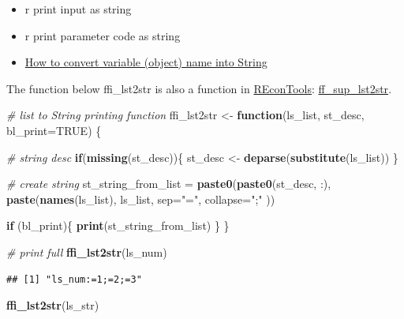 \documentclass[
]{book}
\newenvironment{Shaded}{\begin{snugshade}}{\end{snugshade}}
\newcommand{\CommentTok}[1]{\textcolor[rgb]{0.56,0.35,0.01}{\textit{#1}}}
\newcommand{\ControlFlowTok}[1]{\textcolor[rgb]{0.13,0.29,0.53}{\textbf{#1}}}
\newcommand{\DataTypeTok}[1]{\textcolor[rgb]{0.13,0.29,0.53}{#1}}
\newcommand{\KeywordTok}[1]{\textcolor[rgb]{0.13,0.29,0.53}{\textbf{#1}}}
\newcommand{\NormalTok}[1]{#1}
\newcommand{\OtherTok}[1]{\textcolor[rgb]{0.56,0.35,0.01}{#1}}
\newcommand{\StringTok}[1]{\textcolor[rgb]{0.31,0.60,0.02}{#1}}
\providecommand{\tightlist}{%
  \setlength{\itemsep}{0pt}\setlength{\parskip}{0pt}}
\begin{document}
\begin{itemize}
\tightlist
\item
  r print input as string
\item
  r print parameter code as string
\item
  \href{https://stackoverflow.com/a/14577878/8280804}{How to convert variable (object) name into String}
\end{itemize}

The function below ffi\_lst2str is also a function in \href{https://fanwangecon.github.io/REconTools/index.html}{REconTools}: \href{https://fanwangecon.github.io/REconTools/reference/ff_sup_lst2str.html}{ff\_sup\_lst2str}.

\begin{Shaded}
\begin{Highlighting}[]
\CommentTok{\# list to String printing function}
\NormalTok{ffi\_lst2str \textless{}{-}}\StringTok{ }\ControlFlowTok{function}\NormalTok{(ls\_list, st\_desc, }\DataTypeTok{bl\_print=}\OtherTok{TRUE}\NormalTok{) \{}

  \CommentTok{\# string desc}
  \ControlFlowTok{if}\NormalTok{(}\KeywordTok{missing}\NormalTok{(st\_desc))\{}
\NormalTok{    st\_desc \textless{}{-}}\StringTok{ }\KeywordTok{deparse}\NormalTok{(}\KeywordTok{substitute}\NormalTok{(ls\_list))}
\NormalTok{  \}}

  \CommentTok{\# create string}
\NormalTok{  st\_string\_from\_list =}\StringTok{ }\KeywordTok{paste0}\NormalTok{(}\KeywordTok{paste0}\NormalTok{(st\_desc, }\StringTok{\textquotesingle{}:\textquotesingle{}}\NormalTok{),}
                               \KeywordTok{paste}\NormalTok{(}\KeywordTok{names}\NormalTok{(ls\_list), ls\_list, }\DataTypeTok{sep=}\StringTok{"="}\NormalTok{, }\DataTypeTok{collapse=}\StringTok{";"}\NormalTok{ ))}

  \ControlFlowTok{if}\NormalTok{ (bl\_print)\{}
    \KeywordTok{print}\NormalTok{(st\_string\_from\_list)}
\NormalTok{  \}}
\NormalTok{\}}

\CommentTok{\# print full}
\KeywordTok{ffi\_lst2str}\NormalTok{(ls\_num)}
\end{Highlighting}
\end{Shaded}

\begin{verbatim}
## [1] "ls_num:=1;=2;=3"
\end{verbatim}

\begin{Shaded}
\begin{Highlighting}[]
\KeywordTok{ffi\_lst2str}\NormalTok{(ls\_str)}
\end{Highlighting}
\end{Shaded}
\end{document}
